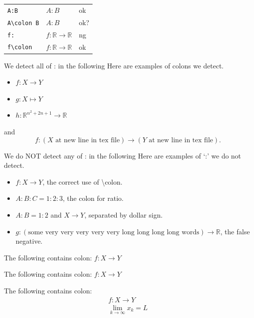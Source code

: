 \documentclass[a4paper]{article}
\newcommand{\tA}[1]{\textcolor{cA}{#1}}
\newcommand{\tC}[1]{\textcolor{cC}{#1}}
\newcommand{\tD}[1]{\textcolor{cD}{#1}}
\begin{document}
\begin{table}[H]
	\centering
	\begin{tabular}{lll}
		\verb|A:B|       & $A:B$                               & \tA{ok}  \\
		\verb|A\colon B| & $A\colon B$                         & \tC{ok?} \\
		\verb|f:|        & $f:\mathbb{R} \to \mathbb{R}$       & \tD{ng}  \\
		\verb|f\colon|   & $f\colon \mathbb{R} \to \mathbb{R}$ & \tA{ok}
	\end{tabular}
\end{table}

\begin{itembox}{We detect all of : in the following}
	Here are examples of colons we detect.
	\begin{itemize}
		\item $f:X \to Y$
		\item \( g: X \mapsto Y \)
		\item $h : \mathbb{R}^{n^2 + 2n + 1} \rightarrow \mathbb{R}$
	\end{itemize}
	and
	\begin{equation} \label{eq:sample}
		f:
		(X \text{ at new line in tex file})
		\to
		(Y \text{ at new line in tex file}).
	\end{equation}
\end{itembox}

\vspace{\baselineskip}

\begin{itembox}{We do NOT detect any of : in the following}
	Here are examples of `:' we do not detect.
	\begin{itemize}
		\item $f\colon X \to Y$, the correct use of \textbackslash{}colon.
		\item $A:B:C = 1:2:3$, the colon for ratio.
		\item $A:B = 1:2$ and $X \to Y$, separated by dollar sign.
		\item $g: (\text{some very very very very very long long long long words}) \to \mathbb{R}$, the false negative.
	\end{itemize}
\end{itembox}

The following contains colon:
$f: X \to Y$

The following contains colon:
\( f: X \to Y \)

The following contains colon:
\begin{align}
	f: X \to Y \label{eq:test} \\
	\lim_{k \to \infty} x_k = L
\end{align}
\end{document}
